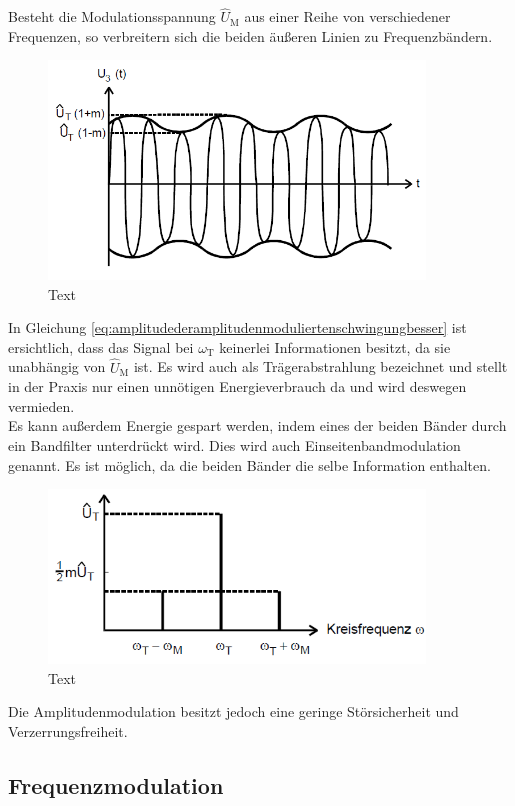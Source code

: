 \documentclass[]{scrartcl}
\begin{document}
Besteht die Modulationsspannung $\hat{U}_\text{M}$ aus einer Reihe von verschiedener Frequenzen, so verbreitern sich die beiden äußeren Linien zu Frequenzbändern.\\
\begin{figure}[H]
\centering 
\includegraphics[width=10cm]{images/zeitabhaengigkeit_momentanspannung.png}
\caption{Text}
\label{fig:zeitabhaengigkeit_momentanspannung}
\end{figure}
In Gleichung \ref{eq:amplitudederamplitudenmoduliertenschwingungbesser} ist ersichtlich, dass das Signal bei $\omega_\text{T}$ keinerlei Informationen besitzt, da sie unabhängig von $\hat{U}_\text{M}$ ist. Es wird auch als Trägerabstrahlung bezeichnet und stellt in der Praxis nur einen unnötigen Energieverbrauch da und wird deswegen vermieden.\\
Es kann außerdem Energie gespart werden, indem eines der beiden Bänder durch ein Bandfilter unterdrückt wird. Dies wird auch Einseitenbandmodulation genannt. Es ist möglich, da die beiden Bänder die selbe Information enthalten.
\begin{figure}[H]
\centering 
\includegraphics[width=10cm]{images/frequenzsprektum_amplitudenmodulierten.png}
\caption{Text}
\label{fig:frequenzsprektum_amplitudenmodulierten}
\end{figure}
Die Amplitudenmodulation besitzt jedoch eine geringe Störsicherheit und Verzerrungsfreiheit.
\subsection{Frequenzmodulation} 
\end{document}
